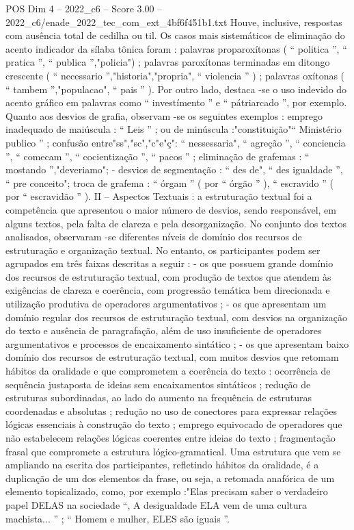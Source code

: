 \begin{textsample}{POS Dim 4 – 2022\_c6 – Score 3.00 – 2022\_c6/enade\_2022\_tec\_com\_ext\_4bf6f451b1.txt}
Houve, inclusive, respostas com ausência total de cedilha ou til.
Os casos mais sistemáticos de eliminação do acento indicador da sílaba tônica foram : palavras proparoxítonas ( “ politica ”, “ pratica ”, “ publica ”,"policia") ; palavras paroxítonas terminadas em ditongo crescente ( “ necessario ”,"historia","propria", “ violencia ” ) ; palavras oxítonas ( “ tambem ”,"populacao", “ pais ” ).
Por outro lado, destaca -se o uso indevido do acento gráfico em palavras como “ investímento ” e “ pátriarcado ”, por exemplo.
Quanto aos desvios de grafia, observam -se os seguintes exemplos : emprego inadequado de maiúscula : “ Leis ” ; ou de minúscula :"constituição"“ Ministério publico ” ; confusão entre"ss","sc","c"e"ç": “ nessessaria", “ agreção ”, “ conciencia ”, “ comecam ”, “ cocientização ”, “ pacos ” ; eliminação de grafemas : “ mostando ”,"deveriamo"; - desvios de segmentação : “ des de", “ des igualdade ”, “ pre conceito"; troca de grafema : “ órgam ” ( por “ órgão ” ), “ escravido ” ( por “ escravidão ” ).
II – Aspectos Textuais : a estruturação textual foi a competência que apresentou o maior número de desvios, sendo responsável, em alguns textos, pela falta de clareza e pela desorganização.
No conjunto dos textos analisados, observaram -se diferentes níveis de domínio dos recursos de estruturação e organização textual.
No entanto, os participantes podem ser agrupados em três faixas descritas a seguir : - os que possuem grande domínio dos recursos de estruturação textual, com produção de textos que atendem às exigências de clareza e coerência, com progressão temática bem direcionada e utilização produtiva de operadores argumentativos ; - os que apresentam um domínio regular dos recursos de estruturação textual, com desvios na organização do texto e ausência de paragrafação, além de uso insuficiente de operadores argumentativos e processos de encaixamento sintático ; - os que apresentam baixo domínio dos recursos de estruturação textual, com muitos desvios que retomam hábitos da oralidade e que comprometem a coerência do texto : ocorrência de sequência justaposta de ideias sem encaixamentos sintáticos ; redução de estruturas subordinadas, ao lado do aumento na frequência de estruturas coordenadas e absolutas ; redução no uso de conectores para expressar relações lógicas essenciais à construção do texto ; emprego equivocado de operadores que não estabelecem relações lógicas coerentes entre ideias do texto ; fragmentação frasal que compromete a estrutura lógico-gramatical.
Uma estrutura que vem se ampliando na escrita dos participantes, refletindo hábitos da oralidade, é a duplicação de um dos elementos da frase, ou seja, a retomada anafórica de um elemento topicalizado, como, por exemplo :"Elas precisam saber o verdadeiro papel DELAS na sociedade “, A desigualdade ELA vem de uma cultura machista... ” ; “ Homem e mulher, ELES são iguais ”.

\end{textsample}
